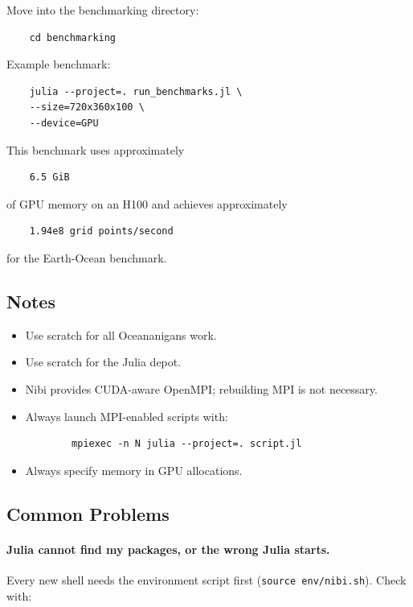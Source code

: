 Move into the benchmarking directory: 

\begin{verbatim} 
    cd benchmarking 
\end{verbatim} 

Example benchmark: 

\begin{verbatim} 
    julia --project=. run_benchmarks.jl \ 
    --size=720x360x100 \ 
    --device=GPU 
\end{verbatim} 

This benchmark uses approximately 

\begin{verbatim} 
    6.5 GiB 
\end{verbatim} 

of GPU memory on an H100 and achieves approximately 

\begin{verbatim} 
    1.94e8 grid points/second 
\end{verbatim} 

for the Earth-Ocean benchmark. 

\subsection{Notes} 

\begin{itemize} 
    \item Use scratch for all Oceananigans work. 
    \item Use scratch for the Julia depot. 
    \item Nibi provides CUDA-aware OpenMPI; rebuilding MPI is not necessary. 
    \item Always launch MPI-enabled scripts with: 
    \begin{verbatim} 
        mpiexec -n N julia --project=. script.jl 
    \end{verbatim} 
    \item Always specify memory in GPU allocations. 
\end{itemize}

\subsection{Common Problems}

\paragraph{Julia cannot find my packages, or the wrong Julia starts.}
Every new shell needs the environment script first (\texttt{source env/nibi.sh}). Check with:

